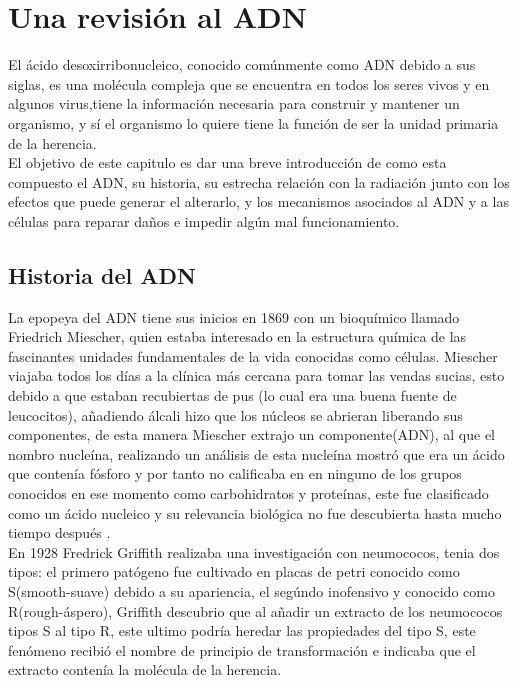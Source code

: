 
\clearpage

\section{Una revisión al ADN}
El ácido desoxirribonucleico, conocido comúnmente como ADN debido a sus siglas, es una molécula compleja que se encuentra en todos los seres vivos y en algunos virus,tiene la información necesaria para construir y mantener un organismo, y sí el organismo lo quiere tiene la función de ser la unidad primaria de la herencia.\\

El objetivo de este capitulo es dar una breve introducción de como esta compuesto el ADN, su historia, su estrecha relación con la radiación junto con los efectos que puede generar el alterarlo, y los mecanismos asociados al ADN y a las células para reparar daños e impedir algún mal funcionamiento.\\


\subsection{Historia del ADN}
La epopeya del ADN tiene sus inicios en 1869 con un bioquímico llamado Friedrich Miescher, quien estaba interesado en la estructura química de las fascinantes unidades fundamentales de la vida conocidas como células.
Miescher viajaba todos los días a la clínica más cercana para tomar las vendas sucias, esto debido a que estaban recubiertas de pus (lo cual era una buena fuente de leucocitos), añadiendo álcali hizo que los núcleos se abrieran liberando sus componentes, de esta manera Miescher extrajo un componente(ADN), al que el nombro nucleína, realizando un análisis de esta nucleína mostró que era un ácido que contenía fósforo y por tanto no calificaba en en ninguno de los grupos conocidos en ese momento como carbohidratos y proteínas, este fue clasificado como un ácido nucleico y su relevancia biológica no fue descubierta hasta mucho tiempo después \cite{Susan}.\\

En 1928 Fredrick Griffith realizaba una investigación con neumococos, tenia dos tipos: el primero patógeno  fue cultivado en placas de petri conocido como S(smooth-suave) debido a su apariencia, el segúndo inofensivo y conocido como R(rough-áspero), Griffith descubrio que al añadir un extracto de los neumococos tipos S al tipo R, este ultimo podría heredar las propiedades del tipo S, este fenómeno recibió el nombre de principio de transformación e indicaba que el extracto contenía la molécula de la herencia.\\

